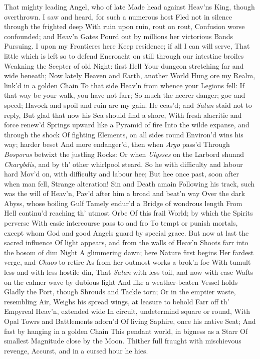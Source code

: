 \documentclass[11pt]{book}
\newcounter {first}
\newcounter {last}
\begin{document}
That mighty leading Angel, who of late 
Made head against Heav'ns King, though overthrown. 
I saw and heard, for such a numerous host 
Fled not in silence through the frighted deep 
With ruin upon ruin, rout on rout, 
Confusion worse confounded; and Heav'n Gates 
Pourd out by millions her victorious Bands 
Pursuing.  I upon my Frontieres here 
Keep residence; if all I can will serve, 
That little which is left so to defend 
Encroacht on still through our intestine broiles 
Weakning the Scepter of old Night: first Hell 
Your dungeon stretching far and wide beneath; 
Now lately Heaven and Earth, another World 
Hung ore my Realm, link'd in a golden Chain 
To that side Heav'n from whence your Legions fell: 
If that way be your walk, you have not farr; 
So much the neerer danger; goe and speed; 
Havock and spoil and ruin are my gain. 
\quad He ceas'd; and \textit{Satan} staid not to reply, 
But glad that now his Sea should find a shore, 
With fresh alacritie and force renew'd 
Springs upward like a Pyramid of fire 
Into the wilde expanse, and through the shock 
Of fighting Elements, on all sides round 
Environ'd wins his way; harder beset 
And more endanger'd, then when \textit{Argo} pass'd 
Through \textit{Bosporus} betwixt the justling Rocks: 
Or when \textit{Ulysses} on the Larbord shunnd 
\textit{Charybdis}, and by th' other whirlpool steard. 
So he with difficulty and labour hard 
Mov'd on, with difficulty and labour hee; 
But hee once past, soon after when man fell, 
Strange alteration!  Sin and Death amain 
Following his track, such was the will of Heav'n, 
Pav'd after him a broad and beat'n way 
Over the dark Abyss, whose boiling Gulf 
Tamely endur'd a Bridge of wondrous length 
From Hell continu'd reaching th' utmost Orbe 
Of this frail World; by which the Spirits perverse 
With easie intercourse pass to and fro 
To tempt or punish mortals, except whom 
God and good Angels guard by special grace. 
But now at last the sacred influence 
Of light appears, and from the walls of Heav'n 
Shoots farr into the bosom of dim Night 
A glimmering dawn; here Nature first begins 
Her fardest verge, and \textit{Chaos} to retire 
As from her outmost works a brok'n foe 
With tumult less and with less hostile din, 
That \textit{Satan} with less toil, and now with ease 
Wafts on the calmer wave by dubious light 
And like a weather-beaten Vessel holds 
Gladly the Port, though Shrouds and Tackle torn; 
Or in the emptier waste, resembling Air, 
Weighs his spread wings, at leasure to behold 
Farr off th' Empyreal Heav'n, extended wide 
In circuit, undetermind square or round, 
With Opal Towrs and Battlements adorn'd 
Of living Saphire, once his native Seat; 
And fast by hanging in a golden Chain 
This pendant world, in bigness as a Starr 
Of smallest Magnitude close by the Moon. 
Thither full fraught with mischievous revenge, 
Accurst, and in a cursed hour he hies. 
 
\end{document}
